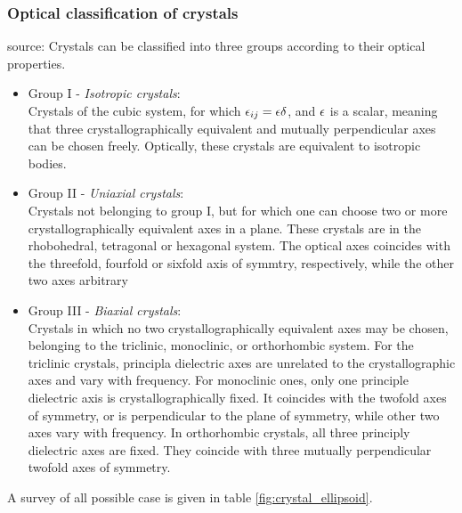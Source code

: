 \subsubsection{Optical classification of crystals}
\label{sec:optical_axes}
source: \cite{landau1984electrodynamics}
Crystals can be classified into three groups according to their 
optical properties. 
\begin{itemize}
    \item 
    Group I - \emph{Isotropic crystals}:\\
    Crystals of the cubic system, for which $\epsilon_{ij} = \epsilon \delta$, and 
    $\epsilon$ is a scalar, meaning that three crystallographically 
    equivalent and mutually perpendicular axes can be chosen freely. 
    Optically, these crystals are equivalent to isotropic bodies. 
    \item
    Group II - \emph{Uniaxial crystals}: \\
    Crystals not belonging to group I, but for which one can choose 
    two or more crystallographically equivalent axes in a plane. 
    These crystals are in the rhobohedral, tetragonal or hexagonal system. 
    The optical axes coincides with the threefold, 
    fourfold or sixfold axis of symmtry, respectively, while the 
    other two axes arbitrary
    \item
    Group III - \emph{Biaxial crystals}: \\
    Crystals in which no two crystallographically equivalent axes may 
    be chosen, belonging to the triclinic, monoclinic, or orthorhombic 
    system. For the triclinic crystals, principla dielectric axes are 
    unrelated to the crystallographic  axes and vary with frequency. 
    For monoclinic ones, only one principle dielectric axis is crystallographically 
    fixed. It coincides with the twofold axes of symmetry, 
    or is perpendicular to the plane of symmetry, while other two axes 
    vary with frequency. 
    In orthorhombic crystals, all three principly dielectric axes are fixed. 
    They coincide with three mutually perpendicular twofold axes of symmetry.
\end{itemize}
A survey of all possible case is given in table \ref{fig:crystal_ellipsoid}.

